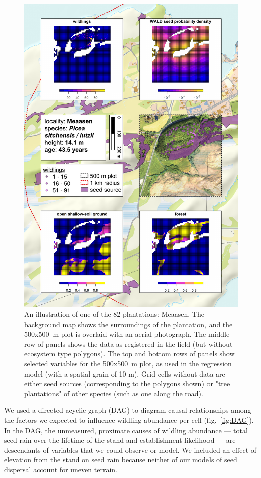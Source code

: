 \documentclass[
]{article}
\begin{document}
\begin{figure}
\includegraphics[width=0.9\linewidth]{figures/site-example/site-example} \caption{An illustration of one of the 82 plantations: Meaasen. The background map shows the surroundings of the plantation, and the 500x500 m plot is overlaid with an aerial photograph. The middle row of panels shows the data as registered in the field (but without ecosystem type polygons). The top and bottom rows of panels show selected variables for the 500x500 m plot, as used in the regression model (with a spatial grain of 10 m). Grid cells without data are either seed sources (corresponding to the polygons shown) or "tree plantations" of other species (such as one along the road).}\label{fig:site-example}
\end{figure}

We used a directed acyclic graph (DAG) to diagram causal relationships among the factors we expected to influence wildling abundance per cell (fig.~\ref{fig:DAG}).
In the DAG, the unmeasured, proximate causes of wildling abundance --- total seed rain over the lifetime of the stand and establishment likelihood --- are descendants of variables that we could observe or model.
We included an effect of elevation from the stand on seed rain because neither of our models of seed dispersal account for uneven terrain.
\end{document}
